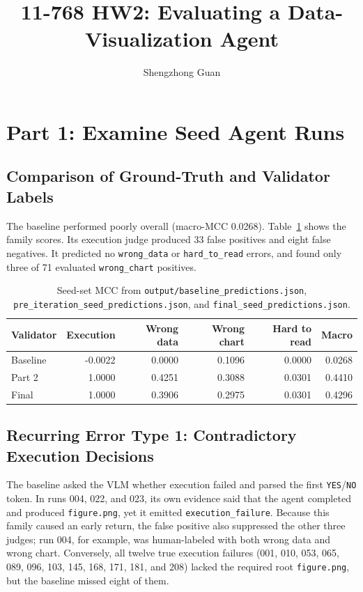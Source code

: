 \documentclass[11pt]{article}
\title{11-768 HW2: Evaluating a Data-Visualization Agent}
\author{Shengzhong Guan}
\date{}
\begin{document}
\maketitle

\section{Part 1: Examine Seed Agent Runs}

\subsection{Comparison of Ground-Truth and Validator Labels}
The baseline performed poorly overall (macro-MCC 0.0268). Table~\ref{tab:seed}
shows the family scores. Its execution judge produced 33 false positives and
eight false negatives. It predicted no \texttt{wrong\_data} or
\texttt{hard\_to\_read} errors, and found only three of 71 evaluated
\texttt{wrong\_chart} positives.

\begin{table}[h]
\centering
\caption{Seed-set MCC from \texttt{output/baseline\_predictions.json}, \texttt{pre\_iteration\_seed\_predictions.json}, and \texttt{final\_seed\_predictions.json}.}
\label{tab:seed}
\begin{tabular}{lrrrrr}
\toprule
Validator & Execution & Wrong data & Wrong chart & Hard to read & Macro \\
\midrule
Baseline & -0.0022 & 0.0000 & 0.1096 & 0.0000 & 0.0268 \\
Part 2 & 1.0000 & 0.4251 & 0.3088 & 0.0301 & 0.4410 \\
Final & 1.0000 & 0.3906 & 0.2975 & 0.0301 & 0.4296 \\
\bottomrule
\end{tabular}
\end{table}

\subsection{Recurring Error Type 1: Contradictory Execution Decisions}
The baseline asked the VLM whether execution failed and parsed the first
\texttt{YES}/\texttt{NO} token. In runs 004, 022, and 023, its own evidence said
that the agent completed and produced \texttt{figure.png}, yet it emitted
\texttt{execution\_failure}. Because this family caused an early return, the
false positive also suppressed the other three judges; run 004, for example,
was human-labeled with both wrong data and wrong chart. Conversely, all twelve
true execution failures (001, 010, 053, 065, 089, 096, 103, 145, 168, 171,
181, and 208) lacked the required root \texttt{figure.png}, but the baseline
missed eight of them.
\end{document}
